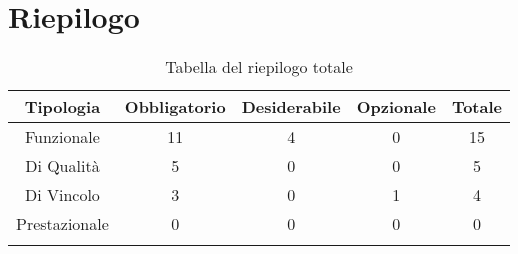 \section{Riepilogo}

\begin{center}
  \centering
  \begin{longtable}{|c|c|c|c|c|}
    \hline
    \rowcolor[HTML]{036400}
    {\color[HTML]{FFFFFF} \textbf{Tipologia}} & {\color[HTML]{FFFFFF} \textbf{Obbligatorio}} & {\color[HTML]{FFFFFF} \textbf{Desiderabile}} & {\color[HTML]{FFFFFF} \textbf{Opzionale}}  & {\color[HTML]{FFFFFF} \textbf{Totale}} \\ \hline
    \rowcolor[HTML]{EFEFEF}
    Funzionale & 11 & 4 & 0 & 15 \\ \hline
    \rowcolor[HTML]{C0C0C0}
    Di Qualità & 5 & 0 & 0 & 5 \\ \hline
    \rowcolor[HTML]{EFEFEF}
    Di Vincolo & 3 & 0 & 1 & 4 \\ \hline
    \rowcolor[HTML]{C0C0C0}
    Prestazionale & 0 & 0 & 0 & 0 \\ \hline

    \caption{Tabella del riepilogo totale}
  \end{longtable}
\end{center}
